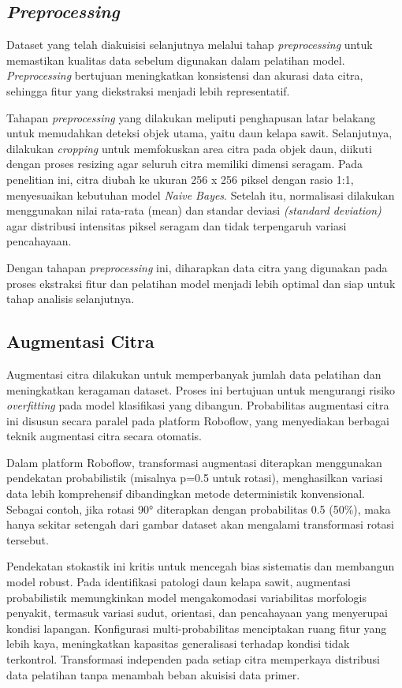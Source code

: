 \subsection{\textit{Preprocessing}} \label{III.Preprocessing }
Dataset yang telah diakuisisi selanjutnya melalui tahap \textit{preprocessing} untuk memastikan kualitas data sebelum digunakan dalam pelatihan model. \textit{Preprocessing} bertujuan meningkatkan konsistensi dan akurasi data citra, sehingga fitur yang diekstraksi menjadi lebih representatif.

Tahapan \textit{preprocessing} yang dilakukan meliputi penghapusan latar belakang untuk memudahkan deteksi objek utama, yaitu daun kelapa sawit. Selanjutnya, dilakukan \textit{cropping} untuk memfokuskan area citra pada objek daun, diikuti dengan proses resizing agar seluruh citra memiliki dimensi seragam. Pada penelitian ini, citra diubah ke ukuran 256 x 256 piksel dengan rasio 1:1, menyesuaikan kebutuhan model \textit{Naive Bayes}. Setelah itu, normalisasi dilakukan menggunakan nilai rata-rata (mean) dan standar deviasi \textit{(standard deviation)} agar distribusi intensitas piksel seragam dan tidak terpengaruh variasi pencahayaan.

Dengan tahapan \textit{preprocessing} ini, diharapkan data citra yang digunakan pada proses ekstraksi fitur dan pelatihan model menjadi lebih optimal dan siap untuk tahap analisis selanjutnya.

\subsection{Augmentasi Citra} \label{III.Augmentasi Citra}
Augmentasi citra dilakukan untuk memperbanyak jumlah data pelatihan dan meningkatkan keragaman dataset. Proses ini bertujuan untuk mengurangi risiko \textit{overfitting} pada model klasifikasi yang dibangun. Probabilitas augmentasi citra ini disusun secara paralel pada platform Roboflow, yang menyediakan berbagai teknik augmentasi citra secara otomatis.

Dalam platform Roboflow, transformasi augmentasi diterapkan menggunakan pendekatan probabilistik (misalnya p=0.5 untuk rotasi), menghasilkan variasi data lebih komprehensif dibandingkan metode deterministik konvensional. Sebagai contoh, jika rotasi 90° diterapkan dengan probabilitas 0.5 (50\%), maka hanya sekitar setengah dari gambar dataset akan mengalami transformasi rotasi tersebut. 

Pendekatan stokastik ini kritis untuk mencegah bias sistematis dan membangun model robust. Pada identifikasi patologi daun kelapa sawit, augmentasi probabilistik memungkinkan model mengakomodasi variabilitas morfologis penyakit, termasuk variasi sudut, orientasi, dan pencahayaan yang menyerupai kondisi lapangan. Konfigurasi multi-probabilitas menciptakan ruang fitur yang lebih kaya, meningkatkan kapasitas generalisasi terhadap kondisi tidak terkontrol. Transformasi independen pada setiap citra memperkaya distribusi data pelatihan tanpa menambah beban akuisisi data primer.

